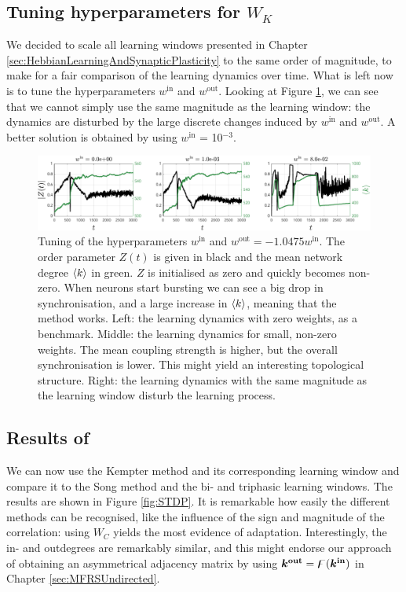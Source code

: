 \subsection{Tuning hyperparameters for \texorpdfstring{$W_K$}{TEXT}}
We decided to scale all learning windows presented in Chapter \ref{sec:HebbianLearningAndSynapticPlasticity} to the same order of magnitude, to make for a fair comparison of the learning dynamics over time. What is left now is to tune the hyperparameters $w^{\mathrm{in}}$ and $w^{\mathrm{out}}$. Looking at Figure \ref{fig:KempterWinWout}, we can see that we cannot simply use the same magnitude as the learning window: the dynamics are disturbed by the large discrete changes induced by $w^{\mathrm{in}}$ and $w^{\mathrm{out}}$. A better solution is obtained by using $w^{\mathrm{in}}$ = 10$^{-3}$.

\begin{figure}[H]
\centering
\includegraphics[width = \textwidth]{../Figures/Learning/KempterWinWout.pdf}
\caption{Tuning of the hyperparameters $w^{\mathrm{in}}$ and $w^{\mathrm{out}} = -1.0475  w^{\mathrm{in}}$. The order parameter $Z(t)$ is given in black and the mean network degree ${\langle k\rangle}$ in green. $Z$ is initialised as zero and quickly becomes non-zero. When neurons start bursting we can see a big drop in synchronisation, and a large increase in ${\langle k\rangle}$, meaning that the \STDP method works. Left: the learning dynamics with zero weights, as a benchmark. Middle: the learning dynamics for small, non-zero weights. The mean coupling strength is higher, but the overall synchronisation is lower. This might yield an interesting topological structure. Right: the learning dynamics with the same magnitude as the learning window disturb the learning process.}
\label{fig:KempterWinWout}
\end{figure}


\subsection{Results of \STDP} \label{sec:STDPlearning} %
We can now use the Kempter method and its corresponding learning window and compare it to the Song method and the bi- and triphasic learning windows. The results are shown in Figure \ref{fig:STDP}. It is remarkable how easily the different methods can be recognised, like the influence of the sign and magnitude of the correlation: using $W_C$ yields the most evidence of adaptation. Interestingly, the in- and outdegrees are remarkably similar, and this might endorse our approach of obtaining an asymmetrical adjacency matrix by using $\boldsymbol{{k^{\rm out}}} = {\digamma} ( {\boldsymbol{k^{\rm in}}} )$ in Chapter \ref{sec:MFRSUndirected}. \\

